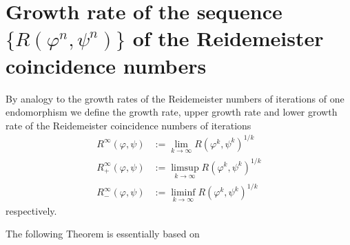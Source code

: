 \documentclass[12pt, a4paper]{amsart}
\begin{document}
\bigskip
\section{ Growth rate of the sequence $\{R(\varphi^n,\psi^n)\}$ of the  Reidemeister coincidence numbers}\label{sec:coincidence-reidemeister}

By analogy to the growth rates of the Reidemeister numbers of iterations of one endomorphism
we define the growth rate, upper growth rate and lower growth rate of the Reidemeister coincidence numbers of iterations
\begin{align*}
  R^\infty(\varphi, \psi) &:= \lim_{k\to\infty} R(\varphi^k, \psi^k)^{1/k}\\
  R_+^\infty(\varphi, \psi) &:= \limsup_{k\to\infty} R(\varphi^k, \psi^k)^{1/k}\\
  R_-^\infty(\varphi, \psi) &:= \liminf_{k\to\infty} R(\varphi^k, \psi^k)^{1/k}
\end{align*}
respectively.

The following Theorem is essentially based on \cite[Thm.~1.4]{FelsKlop}
\end{document}

